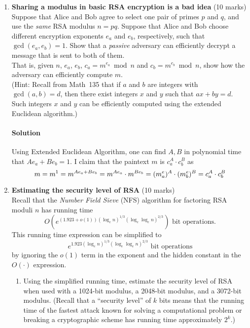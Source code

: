 \documentclass[11pt]{article}
\begin{document}
\begin{enumerate}
\item {\bf Sharing a modulus in basic RSA encryption is a bad idea} (10
marks)\\
Suppose that Alice and Bob agree to select one pair of primes
$p$ and $q$, and use the \emph{same} RSA modulus $n =pq$.
Suppose that Alice and Bob choose different encryption exponents
$e_a$ and $e_b$, respectively, such that $\gcd(e_a,e_b)=1$.
Show that a \emph{passive} adversary can efficiently decrypt a message
that is sent to both of them.\\
That is, given $n$, $e_a$, $e_b$, $c_a = m^{e_a} \bmod{n}$ and
$c_b = m^{e_b} \bmod{n}$, show how the adversary can efficiently
compute $m$.\\
(Hint: Recall from Math~135 that if $a$ and $b$ are integers with
$\gcd(a,b)=d$, then there exist integers $x$ and $y$ such that
$ax+by=d$. Such integers $x$ and $y$ can be efficiently computed using the
extended Euclidean algorithm.)
\paragraph{Solution}
Using Extended Euclidean Algorithm, one can find $A,B$ in polynomial time that $Ae_a+Be_b=1$. I claim that the paintext $m$ is $c_a^A\cdot c_b^B$ as
\begin{equation*}
m=m^1=m^{Ae_a+Be_b}=m^{Ae_a}\cdot m^{Be_b}=(m^e_a)^A\cdot (m^e_b)^B=c_a^A \cdot c_b^B\\
\end{equation*}
\newpage

\item {\bf Estimating the security level of RSA} (10 marks)\\
Recall that the \emph{Number Field Sieve} (NFS) algorithm for factoring
RSA moduli $n$ has running time
\[
O(e^{(1.923 + o(1)) (\log_e n)^{1/3} (\log_e \log_e n)^{2/3}})
\mbox{ bit operations}.
\]
This running time expression can be simplified to
\[
e^{1.923 (\log_e n)^{1/3} (\log_e \log_e n)^{2/3}}
\mbox{ bit operations}
\]
by ignoring the $o(1)$ term in the exponent and the hidden constant
in the $O(\cdot )$ expression.
\begin{enumerate}
\item Using the simplified running time, estimate the security level
of RSA when used with a 1024-bit modulus, a 2048-bit modulus,
and a 3072-bit modulus. (Recall that a ``security level'' of $k$ bits
means that the running time of the fastest attack known for solving
a computational problem or breaking a cryptographic scheme has running
time approximately $2^k$.)

\end{enumerate}
\end{enumerate}
\end{document}
